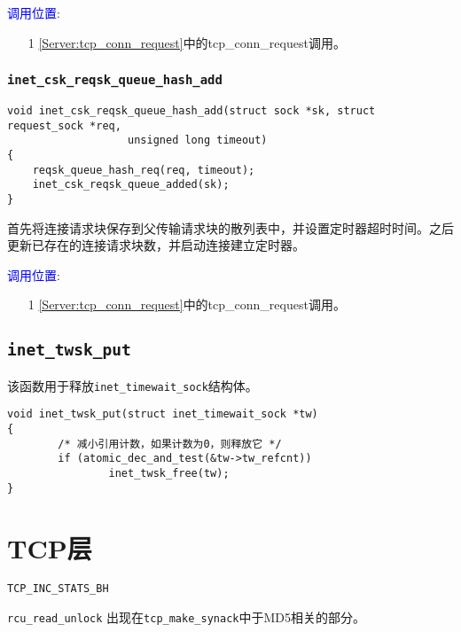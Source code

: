         \textcolor{blue}{调用位置}:

            \begin{enumerate}
                \item[1]        \ref{Server:tcp_conn_request}中的tcp\_conn\_request调用。
            \end{enumerate}

        \subsubsection{\texttt{inet_csk_reqsk_queue_hash_add}}
            \label{INET:inet_csk_reqsk_queue_hash_add}
\begin{verbatim}
void inet_csk_reqsk_queue_hash_add(struct sock *sk, struct request_sock *req,
                   unsigned long timeout)
{
    reqsk_queue_hash_req(req, timeout);
    inet_csk_reqsk_queue_added(sk);
}
\end{verbatim}

        首先将连接请求块保存到父传输请求块的散列表中，并设置定时器超时时间。之后更新已存在的连接请求块数，并启动连接建立定时器。

        \textcolor{blue}{调用位置}:

            \begin{enumerate}
                \item[1]        \ref{Server:tcp_conn_request}中的tcp\_conn\_request调用。
            \end{enumerate}

    \subsection{\texttt{inet_twsk_put}}
该函数用于释放\texttt{inet_timewait_sock}结构体。
\begin{verbatim}
void inet_twsk_put(struct inet_timewait_sock *tw)
{
        /* 减小引用计数，如果计数为0，则释放它 */
        if (atomic_dec_and_test(&tw->tw_refcnt))
                inet_twsk_free(tw);
}
\end{verbatim}

\section{TCP层}

    \texttt{TCP_INC_STATS_BH}

    \texttt{rcu_read_unlock} 出现在\texttt{tcp_make_synack}中于MD5相关的部分。
    
